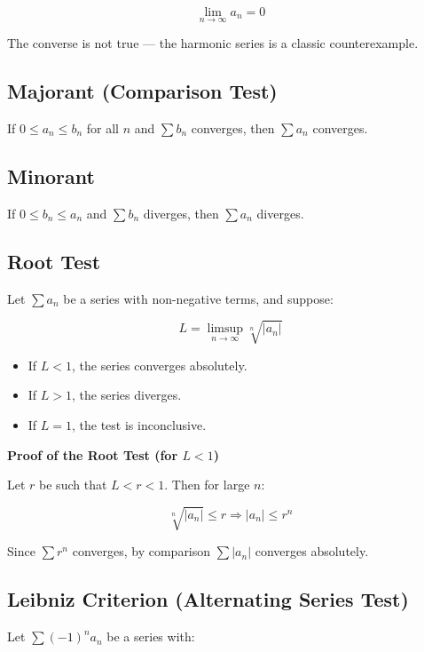 \[
    \lim_{n \to \infty} a_n = 0
\]

The converse is not true — the harmonic series is a classic counterexample.

\subsection{Majorant (Comparison Test)} 

If \(0 \le a_n \le b_n\) for all \(n\) and \(\sum b_n\) converges, then \(\sum a_n\) converges.

\subsection{Minorant} 

If \(0 \le b_n \le a_n\) and \(\sum b_n\) diverges, then \(\sum a_n\) diverges.

\subsection{Root Test}

Let \(\sum a_n\) be a series with non-negative terms, and suppose:

\[
    L = \limsup_{n \to \infty} \sqrt[n]{|a_n|}
\]

\begin{itemize}

  \item If \(L < 1\), the series converges absolutely.

  \item If \(L > 1\), the series diverges.


  \item If \(L = 1\), the test is inconclusive.

\end{itemize}

\textbf{Proof of the Root Test (for \(L < 1\))}

Let \(r\) be such that \(L < r < 1\). Then for large \(n\):

\[
    \sqrt[n]{|a_n|} \le r \Rightarrow |a_n| \le r^n
\]

Since \(\sum r^n\) converges, by comparison \(\sum |a_n|\) converges absolutely.

\subsection{Leibniz Criterion (Alternating Series Test)}

Let \(\sum {(-1)}^n a_n\) be a series with:

